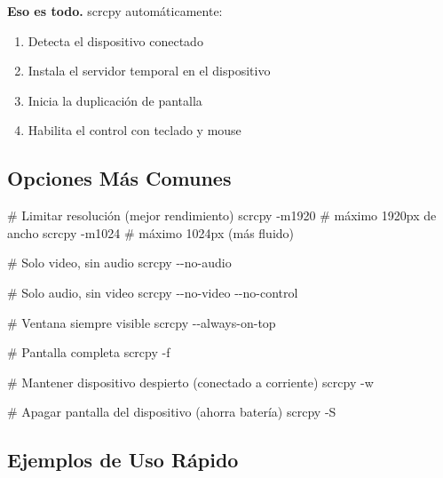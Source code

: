 \documentclass[
  doc,
  floatsintext,
  longtable,
  a4paper,
  nolmodern,
  notxfonts,
  notimes,
  12pt,
  colorlinks=true,linkcolor=blue,citecolor=blue,urlcolor=blue]{apa7}
\newenvironment{Shaded}{\begin{snugshade}}{\end{snugshade}}
\newcommand{\AttributeTok}[1]{\textcolor[rgb]{0.40,0.45,0.13}{#1}}
\newcommand{\CommentTok}[1]{\textcolor[rgb]{0.37,0.37,0.37}{#1}}
\newcommand{\ExtensionTok}[1]{\textcolor[rgb]{0.00,0.23,0.31}{#1}}
\providecommand{\tightlist}{%
  \setlength{\itemsep}{0pt}\setlength{\parskip}{0pt}}
\begin{document}
\textbf{Eso es todo.} scrcpy automáticamente:

\begin{enumerate}
\def\labelenumi{\arabic{enumi}.}
\tightlist
\item
  Detecta el dispositivo conectado
\item
  Instala el servidor temporal en el dispositivo
\item
  Inicia la duplicación de pantalla
\item
  Habilita el control con teclado y mouse
\end{enumerate}

\subsection{Opciones Más Comunes}\label{opciones-muxe1s-comunes}

\begin{Shaded}
\begin{Highlighting}[]
\CommentTok{\# Limitar resolución (mejor rendimiento)}
\ExtensionTok{scrcpy} \AttributeTok{{-}m1920}        \CommentTok{\# máximo 1920px de ancho}
\ExtensionTok{scrcpy} \AttributeTok{{-}m1024}        \CommentTok{\# máximo 1024px (más fluido)}

\CommentTok{\# Solo video, sin audio}
\ExtensionTok{scrcpy} \AttributeTok{{-}{-}no{-}audio}

\CommentTok{\# Solo audio, sin video}
\ExtensionTok{scrcpy} \AttributeTok{{-}{-}no{-}video} \AttributeTok{{-}{-}no{-}control}

\CommentTok{\# Ventana siempre visible}
\ExtensionTok{scrcpy} \AttributeTok{{-}{-}always{-}on{-}top}

\CommentTok{\# Pantalla completa}
\ExtensionTok{scrcpy} \AttributeTok{{-}f}

\CommentTok{\# Mantener dispositivo despierto (conectado a corriente)}
\ExtensionTok{scrcpy} \AttributeTok{{-}w}

\CommentTok{\# Apagar pantalla del dispositivo (ahorra batería)}
\ExtensionTok{scrcpy} \AttributeTok{{-}S}
\end{Highlighting}
\end{Shaded}

\subsection{Ejemplos de Uso Rápido}\label{ejemplos-de-uso-ruxe1pido}
\end{document}
